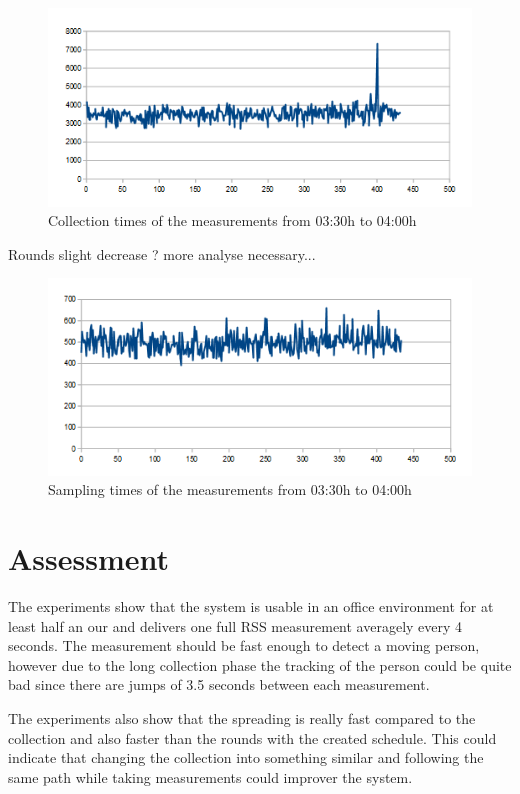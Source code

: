 \begin{figure}[htbp]
	\centering         
    \includegraphics[scale=0.75]{content/images/Experiment/DayCollection}
    \caption{Collection times of the measurements from 03:30h to 04:00h}
	\label{fig:dayC}
\end{figure}

Rounds slight decrease ? more analyse necessary...

\begin{figure}[tbp]
	\centering
    \includegraphics[scale=0.75]{content/images/Experiment/DayRounds}
   	\caption{Sampling times of the measurements from 03:30h to 04:00h}
    \label{fig:DayR}
\end{figure}
    

\section{Assessment}
The experiments show that the system is usable in an office environment for at least half an our and delivers one full RSS measurement averagely every 4 seconds. The measurement should be fast enough to detect a moving person, however due to the long collection phase the tracking of the person could be quite bad since there are jumps of 3.5 seconds between each measurement.

The experiments also show that the spreading is really fast compared to the collection and also faster than the rounds with the created schedule. This could indicate that changing the collection into something similar and following the same path while taking measurements could improver the system. 